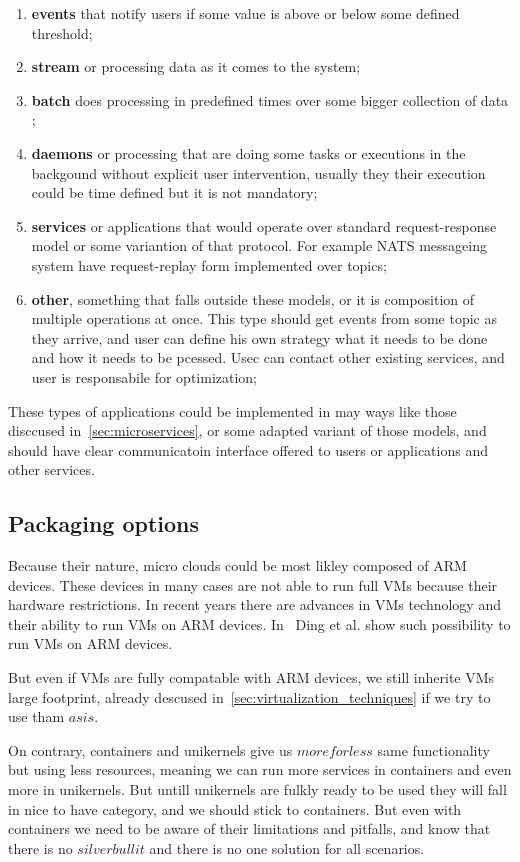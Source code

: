 \begin{enumerate}[start=1,label={(\bfseries \arabic*)}]
	\item \textbf{events} that notify users if some value is above or below some defined threshold; 
	\item \textbf{stream} or processing data as it comes to the system;
	\item \textbf{batch} does processing in predefined times over some bigger collection of data ;
	\item \textbf{daemons} or processing that are doing some tasks or executions in the backgound without explicit user intervention, usually they their execution could be time defined but it is not mandatory;
	\item \textbf{services} or applications that would operate over standard request-response model or some variantion of that protocol. For example NATS messageing system have request-replay form implemented over topics;
	\item \textbf{other}, something that falls outside these models, or it is composition of multiple operations at once. This type should get events from some topic as they arrive, and user can define his own strategy what it needs to be done and how it needs to be pcessed. Usec can contact other existing services, and user is responsabile for optimization;
\end{enumerate}

These types of applications could be implemented in may ways like those disccused in~\ref{sec:microservices}, or some adapted variant of those models, and should have clear communicatoin interface offered to users or applications and other services.
%
\subsection{Packaging options}\label{sec:packaging}
%
Because their nature, micro clouds could be most likley composed of ARM devices. These devices in many cases are not able to run full VMs because their hardware restrictions. In recent years there are advances in VMs technology and their ability to run VMs on ARM devices. In~\cite{Ding12armvisor} Ding et al. show such possibility to run VMs on ARM devices.

But even if VMs are fully compatable with ARM devices, we still inherite VMs large footprint, already descused in~\ref{sec:virtualization_techniques} if we try to use tham $as is$.

On contrary, containers and unikernels give us $more for less$ same functionality but using less resources, meaning we can run more services in containers and even more in unikernels. But untill unikernels are fulkly ready to be used they will fall in nice to have category, and we should stick to containers. But even with containers we need to be aware of their limitations and pitfalls, and know that there is no $silver bullit$ and there is no one solution for all scenarios.

